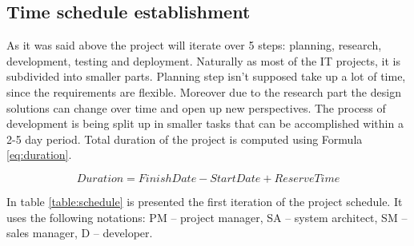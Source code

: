 \documentclass[12pt,a4paper]{report}
\begin{document}
\subsection{Time schedule establishment}
As it was said above the project will iterate over 5 steps: planning, research, development, testing and deployment. Naturally as most of the IT projects, it is subdivided into smaller parts. Planning step isn't supposed take up a lot of time, since the requirements are flexible. Moreover due to the research part the design solutions can change over time and open up new perspectives. The process of development is being split up in smaller tasks that can be accomplished within a 2-5 day period. Total duration of the project is computed using Formula \eqref{eq:duration}.

\begin{equation} \label{eq:duration}
 Duration = FinishDate - StartDate + ReserveTime
\end{equation}

In table \ref{table:schedule} is presented the first iteration of the project schedule. It uses the following notations: PM -- project manager, SA -- system architect, SM -- sales manager, D -- developer.
\end{document}
